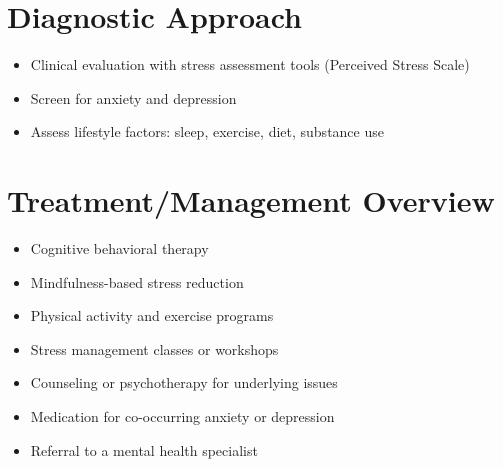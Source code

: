 \section{Diagnostic Approach}
\begin{itemize}
\item Clinical evaluation with stress assessment tools (Perceived Stress Scale)
\item Screen for anxiety and depression
\item Assess lifestyle factors: sleep, exercise, diet, substance use
\end{itemize}

\section{Treatment/Management Overview}
\begin{itemize}
\item Cognitive behavioral therapy
\item Mindfulness-based stress reduction
\item Physical activity and exercise programs
\item Stress management classes or workshops
\item Counseling or psychotherapy for underlying issues
\item Medication for co-occurring anxiety or depression
\item Referral to a mental health specialist
\end{itemize}
